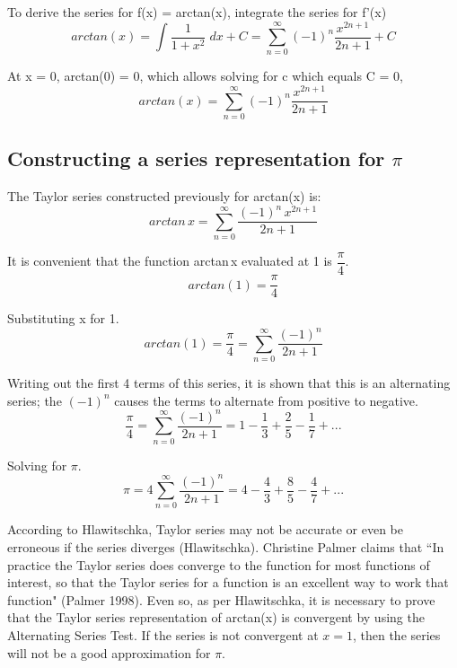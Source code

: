 \documentclass[12pt, titlepage]{article}
\begin{document}
To derive the series for f(x) = arctan(x), integrate the series for f'(x)
\begin{equation*}
    arctan(x) = \int \frac{1}{1+x^{2}} \; dx + C = \sum_{n=0}^{\infty} (-1)^{n}\frac{x^{2n+1}}{2n+1} + C
\end{equation*}

At x = 0, arctan(0) = 0, which allows solving for c which equals C = 0,
\begin{equation*}
    arctan(x) = \sum_{n=0}^{\infty} (-1)^{n}\frac{x^{2n+1}}{2n+1} 
\end{equation*}

\subsection{Constructing a series representation for \(\pi\)}
The Taylor series constructed previously for arctan(x) is:
\begin{equation*}
    arctan\,x = \sum^{\infty}_{n=0} \frac{(-1)^{n}\,x^{2n+1}}{2n+1}
\end{equation*}

It is convenient that the function arctan\,x evaluated at 1 is \(\dfrac{\pi}{4}\).
\begin{equation*}
    arctan(1) = \frac{\pi}{4}
\end{equation*}

Substituting x for 1.
\begin{equation*}
    arctan(1) = \frac{\pi}{4} = \sum_{n=0}^\infty{ \frac{(-1)^n}{2n+1}}
\end{equation*}

Writing out the first 4 terms of this series, it is shown that this is an alternating series; the \((-1)^{n}\) causes the terms to alternate from positive to negative.
\begin{equation*}
    \frac{\pi}{4} =\sum_{n=0}^\infty{ \frac{(-1)^n}{2n+1} = 1 - \frac{1}{3} + \frac{2}{5} - \frac{1}{7} + ... }
\end{equation*}

Solving for \(\pi\).
\begin{equation*}
    \pi = 4 \sum_{n=0}^\infty{ \frac{(-1)^n}{2n+1} = 4 - \frac{4}{3} + \frac{8}{5} - \frac{4}{7} + ... }
\end{equation*}

According to Hlawitschka, Taylor series may not be accurate or even be erroneous if the series diverges (Hlawitschka). Christine Palmer claims that ``In practice the Taylor series does converge to the function for most functions of interest, so that the Taylor series for a function is an excellent way to work that function" (Palmer 1998). Even so, as per Hlawitschka, it is necessary to prove that the Taylor series representation of arctan(x) is convergent by using the Alternating Series Test. If the series is not convergent at \(x = 1\), then the series will not be a good approximation for \(\pi\).
\end{document}
